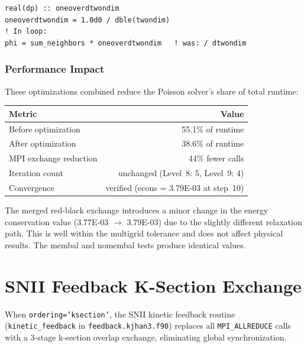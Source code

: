 \documentclass[11pt,fleqn]{book}
\begin{document}
\begin{lstlisting}[style=fortran,numbers=none]
real(dp) :: oneoverdtwondim
oneoverdtwondim = 1.0d0 / dble(twondim)
! In loop:
phi = sum_neighbors * oneoverdtwondim   ! was: / dtwondim
\end{lstlisting}

\subsection{Performance Impact}

These optimizations combined reduce the Poisson solver's share of total runtime:

\begin{center}
\begin{tabular}{lr}
\toprule
\textbf{Metric} & \textbf{Value} \\
\midrule
Before optimization & 55.1\% of runtime \\
After optimization & 38.6\% of runtime \\
MPI exchange reduction & 44\% fewer calls \\
Iteration count & unchanged (Level~8: 5, Level~9: 4) \\
Convergence & verified (econs = 3.79E-03 at step~10) \\
\bottomrule
\end{tabular}
\end{center}

\begin{infobox}
The merged red-black exchange introduces a minor change in the energy conservation value (3.77E-03 $\to$ 3.79E-03) due to the slightly different relaxation path. This is well within the multigrid tolerance and does not affect physical results. The membal and nomembal tests produce identical values.
\end{infobox}


\chapter{SNII Feedback K-Section Exchange}
\label{ch:snii-ksection}

When \texttt{ordering='ksection'}, the SNII kinetic feedback routine (\texttt{kinetic\_feedback} in \texttt{feedback.kjhan3.f90}) replaces all \texttt{MPI\_ALLREDUCE} calls with a 3-stage k-section overlap exchange, eliminating global synchronization.
\end{document}
